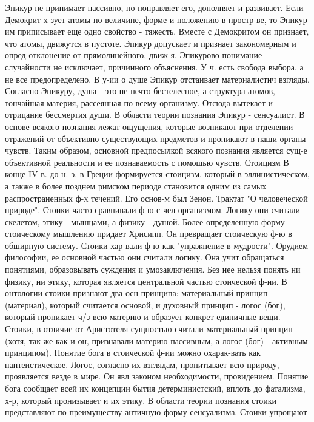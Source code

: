 \documentclass[12pt]{article}
\begin{document}
Эпикур не принимает пассивно, но поправляет его, дополняет и развивает. Если Демокрит х-зует атомы по
величине, форме и положению в простр-ве, то Эпикур им приписывает еще одно свойство - тяжесть. Вместе с
Демокритом он признает, что атомы, движутся в пустоте. Эпикур допускает и признает закономерным и опред
отклонение  от  прямолинейного,  движ-я.  Эпикурово  понимание  случайности  не  исключает,  причинного
объяснения.  У  ч.  есть  свобода  выбора,  а  не  все  предопределено.  В  у-ии  о  душе  Эпикур  отстаивает
материалистич взгляды. Согласно Эпикуру, душа - это не нечто бестелесное, а структура атомов, тончайшая
материя, рассеянная по всему организму. Отсюда вытекает и отрицание бессмертия души. В области теории
познания Эпикур - сенсуалист. В основе всякого познания лежат ощущения, которые возникают при отделении
отражений  от  объективно  существующих  предметов  и  проникают  в  наши  органы  чувств.  Таким  образом,
основной  предпосылкой  всякого  познания  является  сущ-е  объективной  реальности  и  ее  познаваемость  с
помощью чувств. 
Стоицизм В конце IV в. до н. э. в Греции формируется стоицизм, который в эллинистическом, а также в более
позднем римском периоде становится одним из самых распространенных ф-х течений. Его основ-м был Зенон.
Трактат  "О  человеческой  природе".  Стоики  часто  сравнивали  ф-ю  с  чел  организмом.  Логику  они  считали
скелетом, этику - мышцами, а физику - душой. Более определенную форму стоическому мышлению придает
Хрисипп. Он  превращает стоическую  ф-ю  в  обширную  систему.  Стоики  хар-вали ф-ю  как "упражнение  в
мудрости". Орудием философии, ее основной частью они считали логику. Она учит обращаться понятиями,
образовывать  суждения  и  умозаключения.  Без  нее  нельзя  понять  ни  физику,  ни  этику,  которая  является
центральной частью стоической ф-ии. В онтологии стоики признают два осн принципа: материальный принцип
(материал), который считается основой, и духовный принцип - логос (бог), который проникает ч/з всю материю
и образует конкрет единичные  вещи.  Стоики,  в отличие от Аристотеля  сущностью  считали материальный
принцип (хотя, так же как и он, признавали материю пассивным, а логос (бог) - активным принципом). Понятие
бога в стоической ф-ии можно охарак-вать как пантеистическое. Логос, согласно их взглядам, пропитывает всю
природу, проявляется везде в мире. Он явл законом необходимости, провидением. Понятие бога сообщает всей
их концепции бытия детерминистский, вплоть до фатализма, х-р, который пронизывает и их этику. В области
теории  познания  стоики  представляют  по  преимуществу  античную  форму  сенсуализма.  Стоики  упрощают
\end{document}
